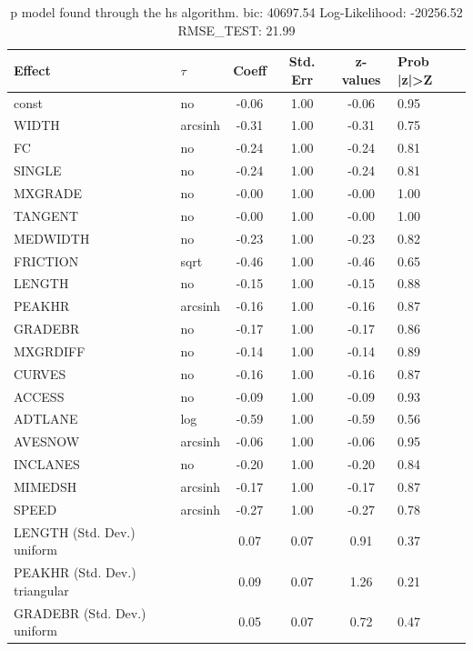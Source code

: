 \begin{table}
	\caption{p model found through the hs algorithm. bic: 40697.54 Log-Likelihood: -20256.52 RMSE_TEST: 21.99}
	\begin{center}
		\begin{tabular}{|l|l|c|c|c|l|}
			\hline
			Effect & $\tau$ & Coeff & Std. Err & z-values & Prob |z|>Z \\
			\hline
			const & no & -0.06 & 1.00 & -0.06 & 0.95 \\
			\hline
			WIDTH & arcsinh & -0.31 & 1.00 & -0.31 & 0.75 \\
			\hline
			FC & no & -0.24 & 1.00 & -0.24 & 0.81 \\
			\hline
			SINGLE & no & -0.24 & 1.00 & -0.24 & 0.81 \\
			\hline
			MXGRADE & no & -0.00 & 1.00 & -0.00 & 1.00 \\
			\hline
			TANGENT & no & -0.00 & 1.00 & -0.00 & 1.00 \\
			\hline
			MEDWIDTH & no & -0.23 & 1.00 & -0.23 & 0.82 \\
			\hline
			FRICTION & sqrt & -0.46 & 1.00 & -0.46 & 0.65 \\
			\hline
			LENGTH & no & -0.15 & 1.00 & -0.15 & 0.88 \\
			\hline
			PEAKHR & arcsinh & -0.16 & 1.00 & -0.16 & 0.87 \\
			\hline
			GRADEBR & no & -0.17 & 1.00 & -0.17 & 0.86 \\
			\hline
			MXGRDIFF & no & -0.14 & 1.00 & -0.14 & 0.89 \\
			\hline
			CURVES & no & -0.16 & 1.00 & -0.16 & 0.87 \\
			\hline
			ACCESS & no & -0.09 & 1.00 & -0.09 & 0.93 \\
			\hline
			ADTLANE & log & -0.59 & 1.00 & -0.59 & 0.56 \\
			\hline
			AVESNOW & arcsinh & -0.06 & 1.00 & -0.06 & 0.95 \\
			\hline
			INCLANES & no & -0.20 & 1.00 & -0.20 & 0.84 \\
			\hline
			MIMEDSH & arcsinh & -0.17 & 1.00 & -0.17 & 0.87 \\
			\hline
			SPEED & arcsinh & -0.27 & 1.00 & -0.27 & 0.78 \\
			\hline
			LENGTH (Std. Dev.) uniform &  & 0.07 & 0.07 & 0.91 & 0.37 \\
			\hline
			PEAKHR (Std. Dev.) triangular &  & 0.09 & 0.07 & 1.26 & 0.21 \\
			\hline
			GRADEBR (Std. Dev.) uniform &  & 0.05 & 0.07 & 0.72 & 0.47 \\

\end{tabular}
\end{center}
\end{table}
